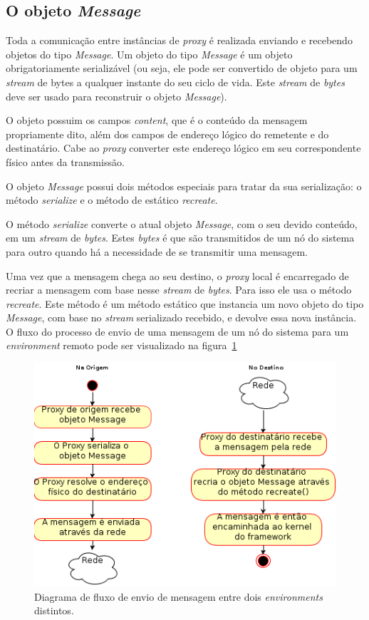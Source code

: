 \subsection{O objeto \emph{Message}}

Toda a comunicação entre instâncias de \textit{proxy} é realizada enviando e recebendo objetos do tipo \textit{Message}. Um objeto do tipo \textit{Message} é um objeto obrigatoriamente serializável (ou seja, ele pode ser convertido de objeto para um \textit{stream} de bytes a qualquer instante do seu ciclo de vida. Este \textit{stream} de \textit{bytes} deve ser usado para reconstruir o objeto \textit{Message}).

O objeto possuim os campos \textit{content}, que é o conteúdo da mensagem propriamente dito, além dos campos de endereço lógico do remetente e do destinatário. Cabe ao \textit{proxy} converter este endereço lógico em seu correspondente físico antes da transmissão.

O objeto \textit{Message} possui dois métodos especiais para tratar da sua serialização: o método \textit{serialize}  e o método de estático \textit{recreate}.

O método \textit{serialize} converte o atual objeto \textit{Message}, com o seu devido conteúdo, em um \textit{stream} de \textit{bytes}. Estes \textit{bytes} é que são transmitidos de um nó do sistema para outro quando há a necessidade de se transmitir uma mensagem.

Uma vez que a mensagem chega ao seu destino, o \textit{proxy} local é encarregado de recriar a mensagem com base nesse \textit{stream} de \textit{bytes}. Para isso ele usa o método \textit{recreate}. Este método é um método estático que instancia um novo objeto do tipo \textit{Message}, com base no \textit{stream} serializado recebido, e devolve essa nova instância. O fluxo do processo de envio de uma mensagem de um nó do sistema para um \textit{environment} remoto pode ser visualizado na figura~\ref{fig:fluxo_troca_msg}

\begin{figure}
  \centerline{\includegraphics{fluxo_troca_msg.png}}
  \caption{Diagrama de fluxo de envio de mensagem entre dois \textit{environments} distintos.}
\label{fig:fluxo_troca_msg}
\end{figure}

